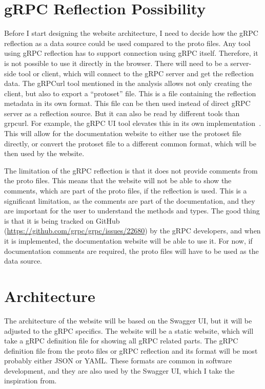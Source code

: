 \section{gRPC Reflection Possibility}
Before I start designing the website architecture, I need to decide how the gRPC reflection as a data source could be used compared to the proto files.
Any tool using gRPC reflection has to support connection using gRPC itself.
Therefore, it is not possible to use it directly in the browser.
There will need to be a server-side tool or client, which will connect to the gRPC server and get the reflection data.
The gRPCurl tool mentioned in the analysis allows not only creating the client, but also to export a \enquote{protoset} file.
This is a file containing the reflection metadata in its own format.
This file can be then used instead of direct gRPC server as a reflection source.
But it can also be read by different tools than grpcurl.
For example, the gRPC UI tool elevates this in its own implementation~\cite{grpc-grpcui}.
This will allow for the documentation website to either use the protoset file directly, or convert the protoset file to a different common format, which will be then used by the website.

The limitation of the gRPC reflection is that it does not provide comments from the proto files.
This means that the website will not be able to show the comments, which are part of the proto files, if the reflection is used.
This is a significant limitation, as the comments are part of the documentation, and they are important for the user to understand the methods and types.
The good thing is that it is being tracked on GitHub (\url{https://github.com/grpc/grpc/issues/22680}) by the gRPC developers, and when it is implemented, the documentation website will be able to use it.
For now, if documentation comments are required, the proto files will have to be used as the data source.


\section{Architecture}
The architecture of the website will be based on the Swagger UI, but it will be adjusted to the gRPC specifics.
The website will be a static website, which will take a gRPC definition file for showing all gRPC related parts.
The gRPC definition file from the proto files or gRPC reflection and its format will be most probably either JSON or YAML\@.
These formats are common in software development, and they are also used by the Swagger UI, which I take the inspiration from.

